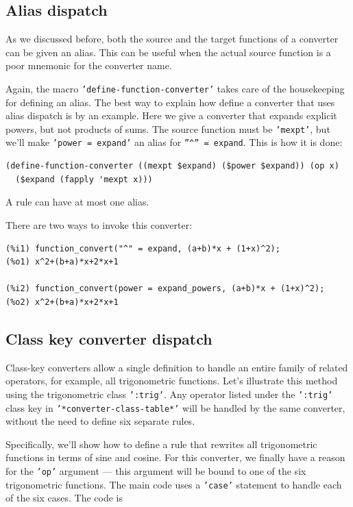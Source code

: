 \documentclass[12pt,fleqn]{extarticle}
\newcommand{\ttq}[1]{\texttt{'#1'}}
\newenvironment{maximabox}
  {\begin{tcolorbox}[
      breakable,
      enhanced,
      colback=white,
      colframe=black!8,
      boxrule=0pt,
      borderline west={2.2pt}{0pt}{black!25},
      arc=1pt,
      left=11pt,
      right=7pt,
      top=9pt,
      bottom=9pt,
      before skip=14pt,
      after skip=14pt
    ]}
  {\end{tcolorbox}}
\begin{document}
\subsection{Alias dispatch}

As we discussed before, both the source and the target functions of a converter can be given an alias.  This can be useful when the actual source function is a poor mnemonic for the converter name.

Again, the macro \ttq{define-function-converter} takes care of the housekeeping 
for defining an alias.  The best way to explain how define a converter that uses
alias dispatch is by an example.  Here we give a converter that expands explicit powers, but not 
products of sums.  The source function must be \ttq{mexpt}, but we'll make
\ttq{power = expand} an alias for \verb|”^” = expand|. This is how it is done:
\begin{maximabox}
\begin{verbatim}
(define-function-converter ((mexpt $expand) ($power $expand)) (op x)
  ($expand (fapply 'mexpt x)))
\end{verbatim}
\end{maximabox}
\noindent A rule can have at most one alias.

There are two ways to invoke this converter:
\begin{maximabox}
\begin{verbatim}
(%i1) function_convert("^" = expand, (a+b)*x + (1+x)^2);
(%o1) x^2+(b+a)*x+2*x+1

(%i2) function_convert(power = expand_powers, (a+b)*x + (1+x)^2);
(%o2) x^2+(b+a)*x+2*x+1
\end{verbatim}
\end{maximabox}



\subsection{Class key converter dispatch}
\label{sec:classkey}

Class-key converters allow a single definition to handle an entire family of
related operators, for example, all trigonometric functions.  Let's illustrate this 
method using the trigonometric class \ttq{:trig}. Any operator listed under the
\ttq{:trig} class key in \ttq{*converter-class-table*} will be handled
by the same converter, without the need to define six separate rules. 

Specifically,  we'll show how to define a rule that rewrites all trigonometric functions in terms of sine
and cosine. For this converter, we finally have a reason for the \ttq{op} argument --- this
argument will be bound to one of the six trigonometric functions.  The
main code uses a \ttq{case} statement to handle each of the six cases. The code is
\end{document}
